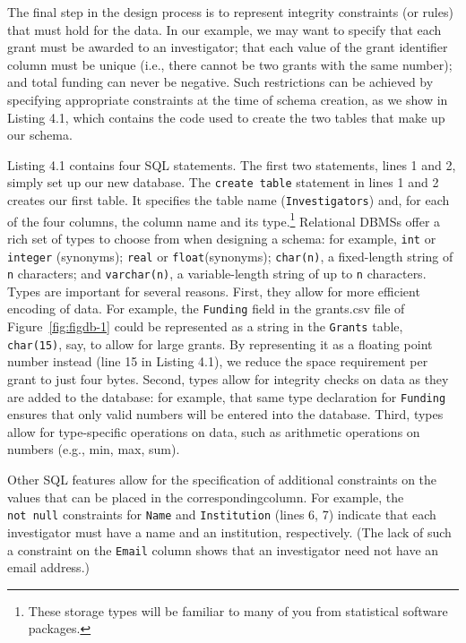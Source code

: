 \documentclass[]{krantz}
\begin{document}
The final step in the design process is to represent integrity
constraints (or rules) that must hold for the data. In our example, we
may want to specify that each grant must be awarded to an investigator;
that each value of the grant identifier column must be unique (i.e.,
there cannot be two grants with the same number); and total funding can
never be negative. Such restrictions can be achieved by specifying
appropriate constraints at the time of schema creation, as we show in
Listing 4.1, which contains the code used to create the two tables that
make up our schema.

Listing 4.1 contains four SQL statements. The first two statements,
lines 1 and 2, simply set up our new database. The
\texttt{create\ table} statement in lines 1 and 2 creates our first
table. It specifies the table name (\texttt{Investigators}) and, for
each of the four columns, the column name and its type.\footnote{These
  storage types will be familiar to many of you from statistical
  software packages.} Relational DBMSs offer a rich set of types to
choose from when designing a schema: for example, \texttt{int} or
\texttt{integer} (synonyms); \texttt{real} or \texttt{float}(synonyms);
\texttt{char(n)}, a fixed-length string of \texttt{n} characters; and
\texttt{varchar(n)}, a variable-length string of up to \texttt{n}
characters. Types are important for several reasons. First, they allow
for more efficient encoding of data. For example, the \texttt{Funding}
field in the grants.csv file of Figure~\ref{fig:figdb-1} could be
represented as a string in the \texttt{Grants} table, \texttt{char(15)},
say, to allow for large grants. By representing it as a floating point
number instead (line 15 in Listing 4.1), we reduce the space requirement
per grant to just four bytes. Second, types allow for integrity checks
on data as they are added to the database: for example, that same type
declaration for \texttt{Funding} ensures that only valid numbers will be
entered into the database. Third, types allow for type-specific
operations on data, such as arithmetic operations on numbers (e.g., min,
max, sum).

Other SQL features allow for the specification of additional constraints
on the values that can be placed in the correspondingcolumn. For
example, the \texttt{not\ null} constraints for \texttt{Name} and
\texttt{Institution} (lines 6, 7) indicate that each investigator must
have a name and an institution, respectively. (The lack of such a
constraint on the \texttt{Email} column shows that an investigator need
not have an email address.)
\end{document}
